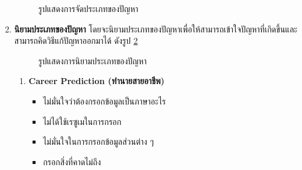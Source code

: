 \begin{enumerate}
          \begin{figure}[H]\centering
              \caption{รูปแสดงการจัดประเภทของปัญหา}\label{fig:Groping}
          \end{figure}
    \item \textbf{นิยามประเภทของปัญหา} โดยจะนิยามประเภทของปัญหาเพื่อให้สามารถเข้าใจปัญหาที่เกิดขึ้นและสามารถคิดวิธีแก้ปัญหาออกมาได้ ดังรูป \ref{fig:CreateTheme}
          \begin{figure}[H]\centering
              \caption{รูปแสดงการนิยามประเภทของปัญหา}\label{fig:CreateTheme}
          \end{figure}
          \begin{enumerate}
              \item \textbf{Career Prediction (ทำนายสายอาชีพ)}
                    \begin{itemize}
                        \item ไม่มั่นใจว่าต้องกรอกข้อมูลเป็นภาษาอะไร
                        \item ไม่ได้ใช้เรซูเมในการกรอก
                        \item ไม่มั่นใจในการกรอกข้อมูลส่วนต่าง ๆ
                        \item กรอกสิ่งที่คาดไม่ถึง

\end{itemize}
\end{enumerate}
\end{enumerate}

